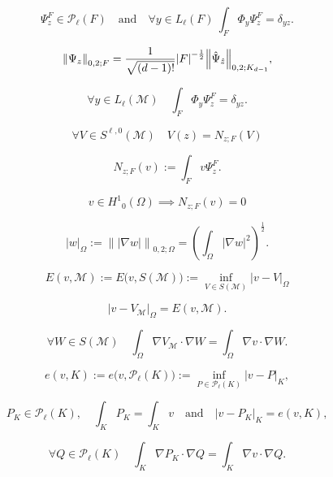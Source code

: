 \documentclass[a4paper]{article}
\begin{document}
\begin{equation}
\label{DBFct}
 {\Psi}_z^{F}\in{\mathcal{P}_{{\ell}}({{F}})}
\quad\text{and}\quad
 \forall y\in{L_{{\ell}}}({F}) \ 
  \int_F {\Phi}_y {\Psi}_z^{F} = \delta_{yz}.
\end{equation}

\begin{equation}
\label{LebnormDBFct2} 
 {{\left\|{{{\Psi}_z}}\right\|_{{0,2;{F}}}}}
 =
 \frac{1}{\sqrt{(d-1)!}}{\left|{F}\right|}^{-\frac12}
 {{\left\|{{\Hat{\Psi}_{\Hat z}}}\right\|_{{0,2;{{K}_{d-1}}}}}},
\end{equation}

\[
 \forall y\in{L_{{\ell}}}({\mathcal{M}})
\quad 
 \int_F {\Phi}_y {\Psi}_z^{F} = \delta_{yz}.
\]

\[
 \forall V\in{S}^{{\ell},0}({\mathcal{M}})
\quad 
 V(z) = {N}_{z;{F}}(V)
\]

\begin{equation}
\label{ScottZhangFct}
 {N}_{z;{F}}(v)
 {:=}
 \int_F v {\Psi}_z^{F}.
\end{equation}

\[
 v\in{H^{{1}}}_0(\Omega)
 \implies
 N_{z;F}(v) = 0
\]

\begin{equation}
\label{H1seminorm}
 {\left|{w}\right|_{{\Omega}}}
 {:=}
 {{\left\|{{|{\nabla} w|}}\right\|_{{0,2;\Omega}}}}
 =
 \left( \int_\Omega |{\nabla} w|^2 \right)^{\frac12}.
\end{equation}

\[
 E(v,{\mathcal{M}})
 {:=}
 E\big( v,{S}({\mathcal{M}}) \big)
 {:=}
 \inf_{V\in{S}({\mathcal{M}})} {\left|{v-V}\right|_{{\Omega}}}
\]

\[
 {\left|{v-V_{\mathcal{M}}}\right|_{{\Omega}}}
 =
 E(v,{\mathcal{M}}).
\]

\[
 \forall W\in{S}({\mathcal{M}})
\quad
 \int_\Omega {\nabla} V_{\mathcal{M}} \cdot {\nabla} W
 =
  \int_\Omega {\nabla} v \cdot {\nabla} W.
\]

\[
 e(v,{K})
 {:=}
 e\big( v,{\mathcal{P}_{{\ell}}({{K}})} \big)
 {:=}
 \inf_{P\in{\mathcal{P}_{{\ell}}({{K}})}} {\left|{v-P}\right|_{K}},
\]

\begin{equation}
\label{Pelm}
 P_{K}\in{\mathcal{P}_{{\ell}}({{K}})},
\quad
 \int_{K} P_{K} = \int_{K} v
\quad\text{and}\quad
 {\left|{v-P_{K}}\right|_{K}}=e(v,{K}),
\end{equation}

\begin{equation}
\label{Pelm:ort}
 \forall Q\in{\mathcal{P}_{{\ell}}({{K}})}
\quad
 \int_{K} {\nabla} P_{K} \cdot {\nabla} Q
 =
 \int_{K} {\nabla} v \cdot {\nabla} Q.
\end{equation}
\end{document}
